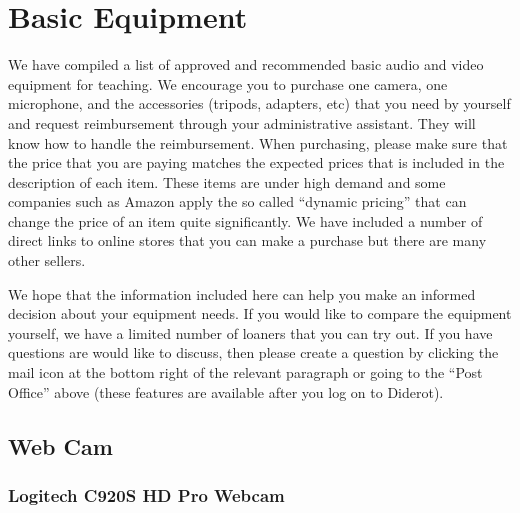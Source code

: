 \chapter{Basic Equipment}
\label{ch:equipment}

\begin{gram}
\label{grm:equipment::preamble}
We have compiled a list of approved and recommended basic audio and video
equipment for teaching.
%
We encourage you to purchase one camera, one microphone, and the
accessories (tripods, adapters, etc) that you need by yourself and
request reimbursement through your administrative assistant.  They
will know how to handle the reimbursement.
%
When purchasing, please make sure that the price that you are paying
matches the expected prices that is included in the description of
each item.
%
These items are under high demand and some companies such as Amazon apply the so called ``dynamic pricing'' that can change the price of an item quite significantly.
%
We have included a number of direct links to online stores that you can make a purchase but there are many other sellers. 


We hope that the information included here can help you make an informed decision about your equipment needs.
%
If you would like to compare the equipment yourself, we have a limited number of loaners that you can try out.  
%
If you have questions are would like to discuss, then please create a
question by clicking the mail icon at the bottom right of the relevant
paragraph or going to the ``Post Office'' above (these features are
available after you log on to Diderot).

\end{gram}

\section{Web Cam}

\subsection{Logitech C920S HD Pro Webcam}
\label{sec:equipment::logitech-920}

